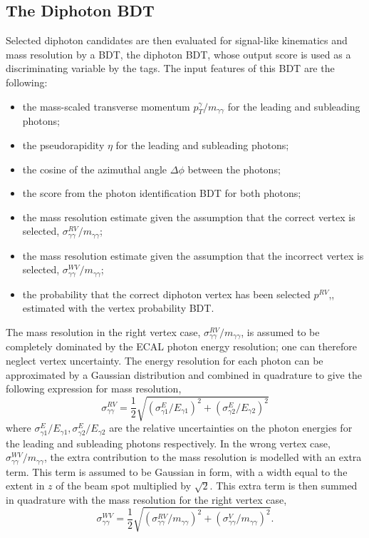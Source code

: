 \subsection{The Diphoton BDT}
Selected diphoton candidates are then evaluated for signal-like kinematics and mass resolution by a BDT, the diphoton BDT, whose output score is used as a discriminating variable by the tags.
The input features of this BDT are the following:
\begin{itemize}[noitemsep]
    \item the mass-scaled transverse momentum $p^{\gamma}_{T}/m_{\gamma\gamma}$ for the leading and subleading photons;
    \item the pseudorapidity $\eta$ for the leading and subleading photons;
    \item the cosine of the azimuthal angle $\Delta\phi$ between the photons;
    \item the score from the photon identification BDT for both photons;
    \item the mass resolution estimate given the assumption that the correct vertex is selected, $\sigma^{RV}_{\gamma\gamma}/m_{\gamma\gamma}$;
    \item the mass resolution estimate given the assumption that the incorrect vertex is selected, $\sigma^{WV}_{\gamma\gamma}/m_{\gamma\gamma}$;
    \item the probability that the correct diphoton vertex has been selected $p^{RV}$,, estimated with the vertex probability BDT.
\end{itemize}

The mass resolution in the right vertex case, $\sigma^{RV}_{\gamma\gamma}/m_{\gamma\gamma}$, is assumed to be completely dominated by the ECAL photon energy resolution; one can therefore neglect vertex uncertainty. The energy resolution for each photon can be approximated by a Gaussian distribution and combined in quadrature to give the following expression for mass resolution,
\begin{equation}
    \sigma^{RV}_{\gamma\gamma} = \frac{1}{2}\sqrt{(\sigma^{E}_{\gamma{1}}/E_{\gamma{1}})^2 + (\sigma^{E}_{\gamma{2}}/E_{\gamma{2}})^2}
\end{equation} 
where $\sigma^{E}_{\gamma{1}}/E_{\gamma{1}}, \sigma^{E}_{\gamma{2}}/E_{\gamma{2}}$ are the relative uncertainties on the photon energies for the leading and subleading photons respectively. 
In the wrong vertex case, $\sigma^{WV}_{\gamma\gamma}/m_{\gamma\gamma}$, the extra contribution to the mass resolution is modelled with an extra term. This term is assumed to be Gaussian in form, with a width equal to the extent in $z$ of the beam spot multiplied by $\sqrt{2}$. This extra term is then summed in quadrature with the mass resolution for the right vertex case,
\begin{equation}
    \sigma^{WV}_{\gamma\gamma} = \frac{1}{2}\sqrt{(\sigma^{RV}_{\gamma\gamma}/m_{\gamma\gamma})^2 + (\sigma^{V}_{\gamma\gamma}/m_{\gamma\gamma})^2}.
\end{equation} 



